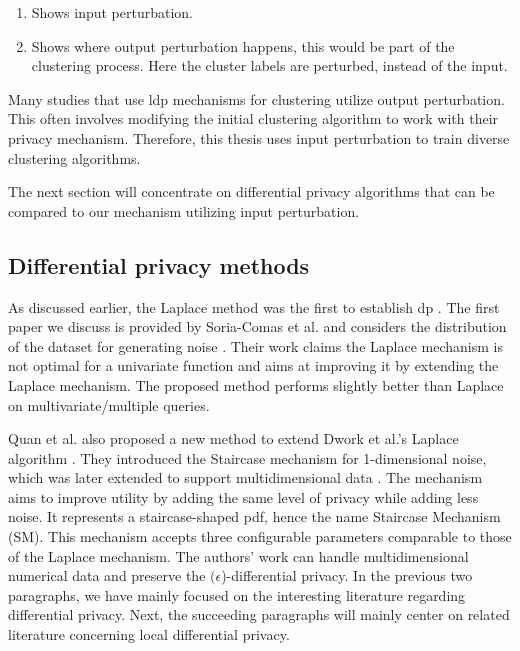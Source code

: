 \begin{enumerate}
  \item Shows input perturbation.
  \item Shows where output perturbation happens, this would be part of the clustering process. Here the cluster labels are perturbed, instead of the input.
\end{enumerate}
Many studies that use \gls{ldp} mechanisms for clustering utilize output perturbation. 
This often involves modifying the initial clustering algorithm to work with their privacy mechanism. 
Therefore, this thesis uses input perturbation to train diverse clustering algorithms.

The next section will concentrate on differential privacy algorithms that can be compared to our mechanism utilizing input perturbation.
\newpage
\subsection{Differential privacy methods}
As discussed earlier, the Laplace method was the first to establish \gls{dp} \citep{dwork_differential_2006}.
The first paper we discuss is provided by Soria-Comas et al. and considers the distribution of the dataset for generating noise \citep{soria-comas_optimal_2013}.
Their work claims the Laplace mechanism is not optimal for a univariate function and aims at improving it by extending the Laplace mechanism.
The proposed method performs slightly better than Laplace on multivariate/multiple queries.

Quan et al. also proposed a new method to extend Dwork et al.'s Laplace algorithm \citep{geng_staircase_2015}.
They introduced the Staircase mechanism for 1-dimensional noise, which was later extended to support multidimensional data \citep{geng_staircase_2015}.
The mechanism aims to improve utility by adding the same level of privacy while adding less noise.
It represents a staircase-shaped \gls{pdf}, hence the name Staircase Mechanism (SM).
This mechanism accepts three configurable parameters comparable to those of the Laplace mechanism.
The authors' work can handle multidimensional numerical data and preserve the  $(\epsilon$)-differential privacy.
In the previous two paragraphs, we have mainly focused on the interesting literature regarding differential privacy.
Next, the succeeding paragraphs will mainly center on related literature concerning local differential privacy.\newline

